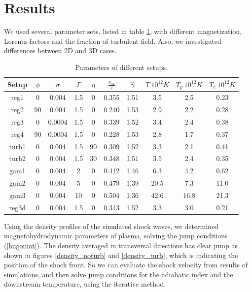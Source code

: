 \documentclass[a4paper]{jpconf}
\begin{document}
	\section{Results}
	We used several parameter sets, listed in table \ref{setups}, with different magnetization, Lorentz-factors and the fraction of turbulent field. Also, we investigated differences between 2D and 3D cases.
	\renewcommand{\arraystretch}{1.1}
	\begin{table}[h!]
		\label{setups}
		\caption{Parameters of different setups. }
		\begin{center}
			\begin{tabular}{|c | c| c| c| c| c| c| c| c| c|}
				\hline
				Setup & $\phi$ & $\sigma$ & $\Gamma$ & $\eta$ & $\frac{v_{sh}}{c}$ & $\hat{\gamma}$ & $T \ 10^{12} K$ & $T_p\ 10^{12}K$ & $T_e \ 10^{12}K$\\
				\hline
				reg1  & 0 & 0.004 & 1.5 & 0 & 0.355 & 1.51 & 3.5 & 2.5 & 0.23\\
				reg2  & 90 & 0.004 & 1.5 & 0 & 0.240 & 1.53 & 2.9 & 2.2 & 0.28\\
				reg3 & 0 & 0.0004 & 1.5 & 0 & 0.339 & 1.52 & 3.4 &2.4 & 0.38\\
				reg4  & 90 & 0.0004 & 1.5 & 0 & 0.228 & 1.53 & 2.8 &1.7 & 0.37\\
				turb1  & 0 & 0.004 & 1.5 & 90 & 0.309 & 1.52 & 3.3 & 2.1 & 0.41\\
				turb2  & 0 & 0.004 & 1.5 & 30 & 0.348 & 1.51 & 3.5 & 2.4 & 0.35\\
				gam1  & 0 & 0.004 & 2 & 0 & 0.412 & 1.46 & 6.3 & 4.2 & 0.62\\
				gam2  & 0 & 0.004 & 5 & 0 & 0.479 & 1.39 & 20.5 & 7.3 & 11.0\\
				gam3  & 0 & 0.004 & 10 & 0 & 0.504 & 1.36 & 42.6 & 16.8 & 21.3\\
				reg3d & 0 & 0.004 & 1.5 & 0 & 0.313 & 1.52 & 3.3 & 3.0 & 0.21\\
				
				\hline
			\end{tabular}
		\end{center}
	\end{table}
	
	Using the density profiles of the simulated shock waves, we determined magnetohydrodynamic parameters of plasma, solving the jump conditions (\ref{hugoniot}). The density averaged in transversal directions has clear jump as shown in figures \ref{density_noturb} and \ref{density_turb}, which is indicating the position of the shock front. So we can evaluate the shock velocity from results of simulations, and then solve jump conditions for the adiabatic index and the downstream temperature, using the iterative method. 
	
\end{document}
